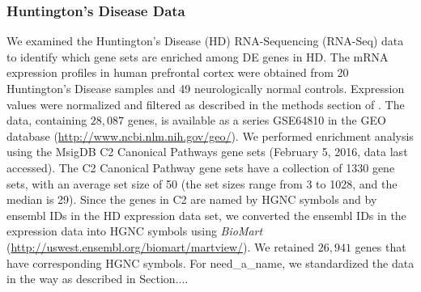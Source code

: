 \documentclass[useAMS,usenatbib, galley]{biom}
\newcommand{\OurMethod}{need\_a\_name}
\begin{document}
	\subsubsection{Huntington's Disease Data}
	We examined the Huntington's Disease (HD) RNA-Sequencing (RNA-Seq) data \citep{labadorf2015rna}  to identify which gene sets are enriched among DE genes in HD. The mRNA expression profiles in human prefrontal cortex were obtained from 20 Huntington's Disease samples and 49 neurologically normal controls.  Expression values were normalized and filtered as described in the methods section of \cite{labadorf2015rna}.
	The data, containing $28,087$ genes, is available as a series GSE64810 in the GEO database (\url{http://www.ncbi.nlm.nih.gov/geo/}). We performed enrichment analysis using the MsigDB \citep{subramanian2005gene} C2 Canonical Pathways gene sets (February 5, 2016, data last accessed). The C2 Canonical Pathway gene sets have a collection of 1330 gene sets, with an average set size of 50 (the set sizes range from 3 to 1028, and the median is 29). Since the genes in C2 are named by HGNC symbols and by ensembl IDs in the HD expression data set, we converted the ensembl IDs in the expression data into HGNC symbols using \textit{BioMart} (\url{http://uswest.ensembl.org/biomart/martview/}). We retained $26,941$ genes that have corresponding HGNC symbols. For \OurMethod, we standardized the data in the way as described in Section....
	
\end{document}

